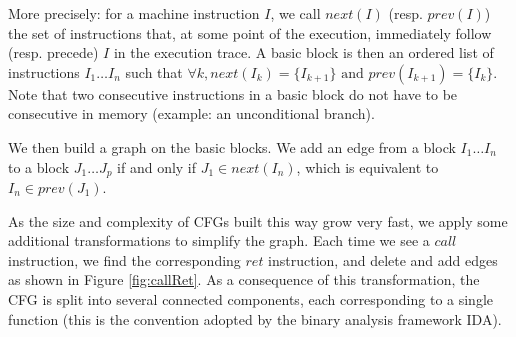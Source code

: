 \documentclass[english]{article}
\begin{document}
More precisely: for a machine instruction $I$, we call $next(I)$ (resp. $prev(I)$) the set of instructions that, at some point of the execution, immediately follow (resp. precede) $I$ in the execution trace. A basic block is then an ordered list of instructions $I_1 \dots I_n$ such that $\forall k, next(I_k) = \{I_{k+1}\} \textrm{ and } prev(I_{k+1}) = \{I_k\}$. Note that two consecutive instructions in a basic block do not have to be consecutive in memory (example: an unconditional branch). 

We then build a graph on the basic blocks. We add an edge from a block $I_1 \dots I_n$ to a block $J_1 \dots J_p$ if and only if $J_1 \in next(I_n)$, which is equivalent to $I_n \in prev(J_1)$.

As the size and complexity of CFGs built this way grow very fast, we apply some additional transformations to simplify the graph. Each time we see a $call$ instruction, we find the corresponding $ret$ instruction, and delete and add edges as shown in Figure \ref{fig:callRet}. As a consequence of this transformation, the CFG is split into several connected components, each corresponding to a single function (this is the convention adopted by the binary analysis framework IDA).
\end{document}
